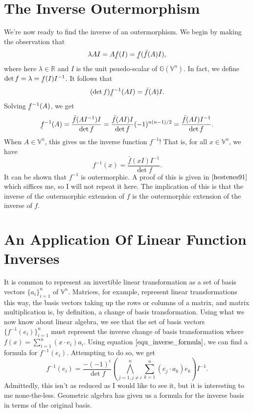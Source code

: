 \documentclass[12pt]{article}
\newcommand{\G}{\mathbb{G}}
\newcommand{\V}{\mathbb{V}}
\newcommand{\R}{\mathbb{R}}
\newcommand{\uf}{\underaccent{\bar}{f}}
\newcommand{\of}{\bar{f}}
\begin{document}
\section{The Inverse Outermorphism}

We're now ready to find the inverse of an outermorphism.  We begin by making the
observation that
\begin{equation*}
\lambda AI = A\uf(I) = \uf(\of(A)I),
\end{equation*}
where here $\lambda\in\R$ and $I$ is the unit psuedo-scalar of $\G(\V^n)$.
In fact, we define $\det f=\lambda = \uf(I)I^{-1}$.  It follows that
\begin{equation*}
(\det f)\uf^{-1}(AI) = \of(A)I.
\end{equation*}
Solving $\uf^{-1}(A)$, we get
\begin{equation*}
\uf^{-1}(A) = \frac{\of(AI^{-1})I}{\det f} = \frac{\of(AI)I}{\det f}(-1)^{n(n-1)/2} = \frac{\of(AI)I^{-1}}{\det f}.
\end{equation*}
When $A\in\V^n$, this gives us the inverse function $f^{-1}$!  That is, for all $x\in\V^n$,
we have
\begin{equation}\label{equ_inverse_formula}
f^{-1}(x) = \frac{\of(xI)I^{-1}}{\det f}.
\end{equation}
It can be shown that $f^{-1}$ is outermorphic.
A proof of this is given in $\cite{hestenes91}$ which siffices me, so I will
not repeat it here.
The implication of this is that the inverse of the outermorphic
extension of $f$ is the outermorphic extension of the inverse of $f$.

\section{An Application Of Linear Function Inverses}

It is common to represent an invertible linear transformation as a set of basis vectors $\{a_i\}_{i=1}^n$ of $\V^n$.
Matrices, for example, represent linear transformations this way, the basis vectors taking up the rows or
columns of a matrix, and matrix multiplication is, by definition, a
change of basis transformation.  Using what we now know about linear algebra, we see that
the set of basis vectors $\{f^{-1}(e_i)\}_{i=1}^n$ must represent the inverse change of basis transformation
where $f(x)=\sum_{i=1}^n (x\cdot e_i)a_i$.  Using equation $\eqref{equ_inverse_formula}$, we can find
a formula for $f^{-1}(e_i)$.
Attempting to do so, we get
\begin{equation*}
f^{-1}(e_i) = \frac{-(-1)^i}{\det f}\left(\bigwedge_{j=1,j\neq i}^n\sum_{k=1}^n (e_j\cdot a_k)e_k\right)I^{-1}.
\end{equation*}
Admittedly, this isn't as reduced as I would like to see it, but it is interesting to me none-the-less.  Geometric algebra
has given us a formula for the inverse basis in terms of the original basis.
\end{document}

